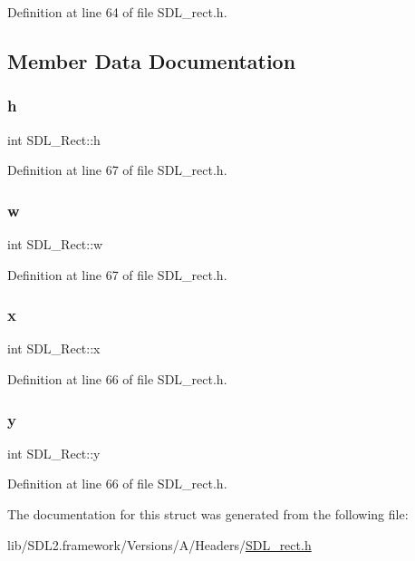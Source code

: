 Definition at line 64 of file S\+D\+L\+\_\+rect.\+h.



\subsection{Member Data Documentation}
\mbox{\label{struct_s_d_l___rect_a0a17d46b320af8063b746153348edd72}} 
\subsubsection{\texorpdfstring{h}{h}}
{\footnotesize\ttfamily int S\+D\+L\+\_\+\+Rect\+::h}



Definition at line 67 of file S\+D\+L\+\_\+rect.\+h.

\mbox{\label{struct_s_d_l___rect_a56b7be5738fb6fab86881534a814c45e}} 
\subsubsection{\texorpdfstring{w}{w}}
{\footnotesize\ttfamily int S\+D\+L\+\_\+\+Rect\+::w}



Definition at line 67 of file S\+D\+L\+\_\+rect.\+h.

\mbox{\label{struct_s_d_l___rect_a85418d94621dd6855805c4b5c7bf6482}} 
\subsubsection{\texorpdfstring{x}{x}}
{\footnotesize\ttfamily int S\+D\+L\+\_\+\+Rect\+::x}



Definition at line 66 of file S\+D\+L\+\_\+rect.\+h.

\mbox{\label{struct_s_d_l___rect_a822694af8ddca5fd0d5d94e47106ab85}} 
\subsubsection{\texorpdfstring{y}{y}}
{\footnotesize\ttfamily int S\+D\+L\+\_\+\+Rect\+::y}



Definition at line 66 of file S\+D\+L\+\_\+rect.\+h.



The documentation for this struct was generated from the following file\+:\begin{DoxyCompactItemize}
\item 
lib/\+S\+D\+L2.\+framework/\+Versions/\+A/\+Headers/\mbox{\hyperlink{_s_d_l__rect_8h}{S\+D\+L\+\_\+rect.\+h}}\end{DoxyCompactItemize}
